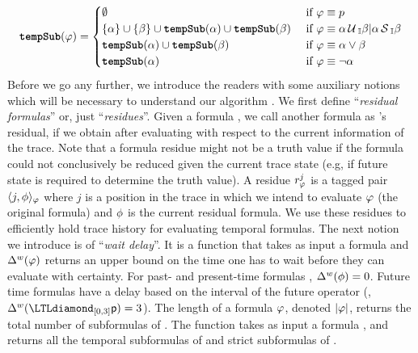 \[
\textbf{\texttt{tempSub}}(\varphi) = \begin{cases}
\emptyset & \mbox{ if } \varphi \equiv p\\
\{\alpha\} \cup \{\beta\} \cup \textbf{\texttt{tempSub}}(\alpha) \cup \textbf{\texttt{tempSub}}(\beta) & \mbox{ if } \varphi\equiv\alpha\,\mathrm{\cal U}\,_\mathbb{I}\beta|\alpha\,\mathrm{\cal S}\,_\mathbb{I}\beta\\
\textbf{\texttt{tempSub}}(\alpha) \cup \textbf{\texttt{tempSub}}(\beta) & \mbox{ if } \varphi\equiv\alpha\vee\beta\\
\textbf{\texttt{tempSub}}(\alpha) & \mbox{ if }\varphi\equiv\neg\alpha
\end{cases}
\]
Before we go any further, we introduce the readers with some auxiliary notions which will be
necessary to understand our algorithm \monitor. We first define ``\emph{residual formulas}'' or, just ``\emph{residues}''.
Given a formula \policy, we call another formula \policyv as \policy's residual, if we obtain \policyv after evaluating \policy with respect to the current information of the trace.
Note that a formula residue might not be a truth value if the formula could not conclusively be reduced given the current trace state (e.g, if future state is required to determine the truth value).
A residue $r^j_{\varphi}$ is a tagged pair $\langle j, \phi \rangle_{\varphi}$ where $j$ is a position in the trace in which we intend to evaluate $\varphi$ (the original formula) and $\phi$ is the current residual formula. We use these residues to efficiently hold trace history for evaluating temporal formulas.
%
The next notion we introduce is of ``\emph{wait delay}''. It is a function \wdelay that takes as input a formula \policy and
$\Delta^w(\varphi)$ returns
an upper bound on the time one has to wait before they can evaluate \policy with certainty.
For past- and present-time formulas \policyv, $\Delta^w(\phi)=0$.
Future time formulas have a delay based on the interval of the future operator
(\eg, $\wdelay(\LTLdiamond_{[0,3]} \pred{p}) = 3$). The length of a formula $\varphi$, denoted $|\varphi|$, returns the total number of subformulas of \policy.
The function \tempSub takes as input a formula \policy, and returns all the temporal subformulas \policyv of \policy and strict subformulas of \policyv.



